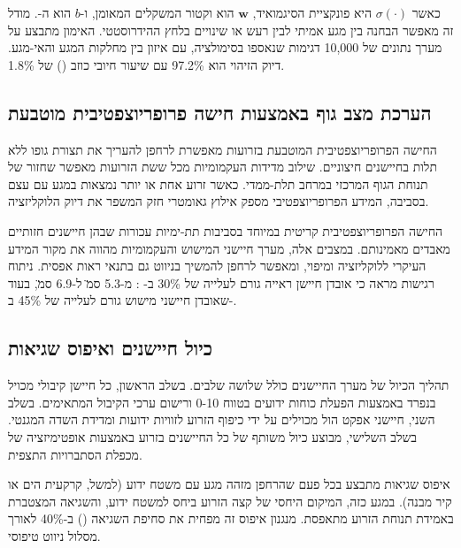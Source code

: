 כאשר $\sigma(\cdot)$ היא פונקציית הסיגמואיד, $\mathbf{w}$ הוא וקטור המשקלים המאומן, ו-$b$ הוא ה-. מודל זה מאפשר הבחנה בין מגע אמיתי לבין רעש או שינויים בלחץ ההידרוסטטי. האימון מתבצע על מערך נתונים של 10,000 דגימות שנאספו בסימולציה, עם איזון בין מחלקות המגע והאי-מגע. דיוק הזיהוי הוא 97.2\% עם שיעור חיובי כוזב () של 1.8\%.

\subsection{הערכת מצב גוף באמצעות חישה פרופריוצפטיבית מוטבעת}
\label{sec:sensors_proprioception}

החישה הפרופריוצפטיבית המוטבעת בזרועות מאפשרת לרחפן להעריך את תצורת גופו ללא תלות בחיישנים חיצוניים. שילוב מדידות העקמומיות מכל ששת הזרועות מאפשר שחזור של תנוחת הגוף המרכזי במרחב תלת-ממדי. כאשר זרוע אחת או יותר נמצאות במגע עם עצם בסביבה, המידע הפרופריוצפטיבי מספק אילוץ גאומטרי חזק המשפר את דיוק הלוקליזציה.

החישה הפרופריוצפטיבית קריטית במיוחד בסביבות תת-ימיות עכורות שבהן חיישנים חזותיים מאבדים מאמינותם. במצבים אלה, מערך חיישני המישוש והעקמומיות מהווה את מקור המידע העיקרי ללוקליזציה ומיפוי, ומאפשר לרחפן להמשיך בניווט גם בתנאי ראות אפסית. ניתוח רגישות מראה כי אובדן חיישן ראייה גורם לעלייה של 30\% ב- : מ-5.3 ס\"מ ל-6.9 ס\"מ, בעוד שאובדן חיישני מישוש גורם לעלייה של 45\% ב-.

\subsection{כיול חיישנים ואיפוס שגיאות}
\label{sec:sensors_calibration}

תהליך הכיול של מערך החיישנים כולל שלושה שלבים. בשלב הראשון, כל חיישן קיבולי מכויל בנפרד באמצעות הפעלת כוחות ידועים בטווח 0-10  ורישום ערכי הקיבול המתאימים. בשלב השני, חיישני אפקט הול מכוילים על ידי כיפוף הזרוע לזוויות ידועות ומדידת השדה המגנטי. בשלב השלישי, מבוצע כיול משותף של כל החיישנים בזרוע באמצעות אופטימיזציה של מכפלת הסתברויות התצפית.

איפוס שגיאות מתבצע בכל פעם שהרחפן מזהה מגע עם משטח ידוע (למשל, קרקעית הים או קיר מבנה). במגע כזה, המיקום היחסי של קצה הזרוע ביחס למשטח ידוע, והשגיאה המצטברת באמידת תנוחת הזרוע מתאפסת. מנגנון איפוס זה מפחית את סחיפת השגיאה () ב-40\% לאורך מסלול ניווט טיפוסי.

